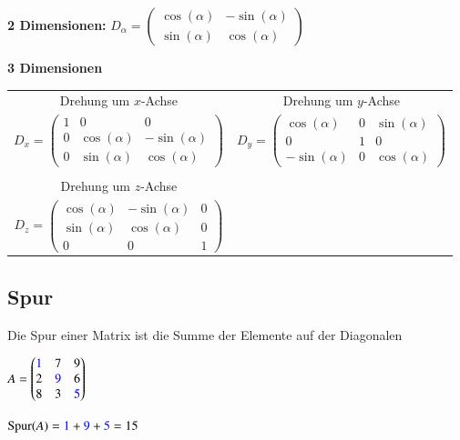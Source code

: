 \vspace{0.3cm}
	  	
\textbf{2 Dimensionen:} 
\quad
$D_{\alpha} = \begin{pmatrix} \cos(\alpha) & -\sin(\alpha)  \\ \sin(\alpha) & \cos(\alpha)  \end{pmatrix}$

\textbf{3 Dimensionen} 
\vspace{0.2cm}

\begin{tabular}{cc}
	Drehung um $x$-Achse & Drehung um $y$-Achse \\
	$D_{x} = \begin{pmatrix} 1 & 0 & 0 \\
	0 & \cos(\alpha) & -\sin(\alpha)  \\ 0 & \sin(\alpha) & \cos(\alpha)  \end{pmatrix}$ & $D_{y} = \begin{pmatrix} \cos(\alpha) & 0 & \sin(\alpha) \\
	0 & 1 & 0 \\ -\sin(\alpha) & 0 & \cos(\alpha)  \end{pmatrix}$\\
	\\
	Drehung um $z$-Achse & \\
	$D_{z} = \begin{pmatrix} \cos(\alpha) & -\sin(\alpha) & 0 \\ \sin(\alpha) & \cos(\alpha) & 0 \\ 0 & 0 & 1 \end{pmatrix}$
\end{tabular}

\subsection{Spur}	
\label{Spur}	  	

Die Spur einer Matrix ist die Summe der Elemente auf der Diagonalen
\vspace{0.2cm}

\begin{minipage}[t]{0.2\columnwidth}
	$A = 
	\begin{pmatrix}
		{\color{blue}1} & 7 & 9 \\
		2 & {\color{blue}9} & 6 \\ 
		8 & 3 & {\color{blue}5}	
	\end{pmatrix}$
\end{minipage}
\hfill
\begin{minipage}[t]{0.7\columnwidth}
	$\mathrm{Spur}(A) = {\color{blue}1} + {\color{blue}9} + {\color{blue}5} = 15$ 
\end{minipage}

